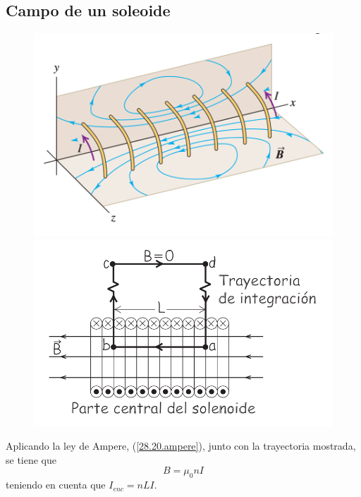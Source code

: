 \subsection{Campo de un soleoide}
\begin{figure}[h]
\centering
\includegraphics[scale=0.4]{fig/solenoide1}
\includegraphics[scale=0.4]{fig/solenoide2}
\end{figure}
Aplicando la ley de Ampere, (\ref{28.20.ampere}), junto con la trayectoria mostrada, se tiene que 
\begin{equation}
B=\mu_0nI
\end{equation}
teniendo en cuenta que $I_{enc}=nLI$.
